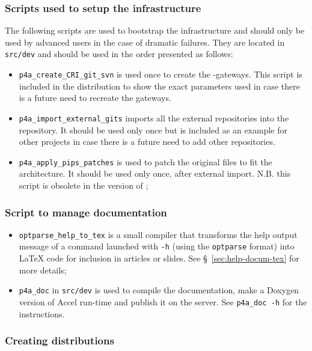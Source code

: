 \documentclass[a4paper]{article}
\begin{document}
\subsubsection{Scripts used to setup the infrastructure}
\label{sec:scripts-used-setup}

The following scripts are used to
bootstrap the \Apfa infrastructure and should only be used by advanced
users in the case of dramatic failures.
They are located in
\texttt{src/dev} and should be used in the order presented as follows:
\begin{itemize}
\item \verb/p4a_create_CRI_git_svn/ is used once to create the \Apips{}
  \Asvn-\Agit gateways. This script is included in the distribution to
  show the exact parameters used in case there is a future need
  to recreate the gateways.
\item \verb/p4a_import_external_gits/ imports all the external \Agit
  repositories into the \Apfa{} \Agit repository. It should be used only
  once but is included as an example for other projects in case there is
  a future need to add other repositories.
\item \verb/p4a_apply_pips_patches/ is used to patch the original \Apips
  files to fit the \Apfa architecture. It should be used only once, after
  external \Agit import. N.B. this script is obsolete in the
  \Aautotools version of \Apips;
\end{itemize}

\subsubsection{Script to manage documentation}
\label{sec:script-deal-with}

\begin{itemize}
\item \verb|optparse_help_to_tex| is a small compiler that transforms the
  help output message of a command launched with \texttt{-h} (using
  the \texttt{optparse} format) into La\TeX{} code for inclusion
  in articles or slides. See \S~\ref{sec:help-docum-tex} for more details;
\item \verb|p4a_doc| in \verb|src/dev| is used to compile the \Apfa
  documentation, make a Doxygen version of \Apfa Accel run-time and
  publish it on the server. See \texttt{p4a\_doc -h} for the instructions.
\end{itemize}


\subsubsection{Creating distributions}
\label{sec:making-distributions}
\end{document}
